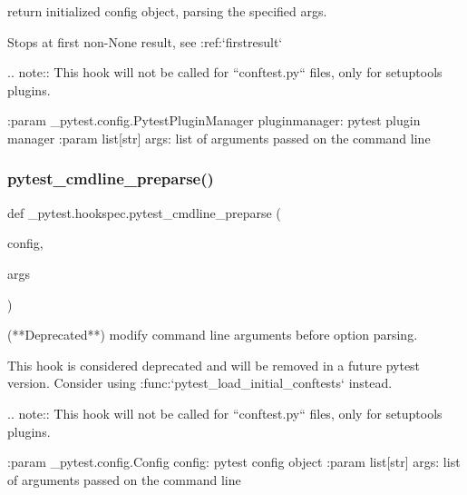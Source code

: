 \begin{DoxyVerb}return initialized config object, parsing the specified args.

Stops at first non-None result, see :ref:`firstresult`

.. note::
    This hook will not be called for ``conftest.py`` files, only for setuptools plugins.

:param _pytest.config.PytestPluginManager pluginmanager: pytest plugin manager
:param list[str] args: list of arguments passed on the command line
\end{DoxyVerb}
 \mbox{\label{namespace__pytest_1_1hookspec_afbabf1ad58d128c7078a1de3228fe31b}} 
\subsubsection{\texorpdfstring{pytest\+\_\+cmdline\+\_\+preparse()}{pytest\_cmdline\_preparse()}}
{\footnotesize\ttfamily def \+\_\+pytest.\+hookspec.\+pytest\+\_\+cmdline\+\_\+preparse (\begin{DoxyParamCaption}\item[{}]{config,  }\item[{}]{args }\end{DoxyParamCaption})}

\begin{DoxyVerb}(**Deprecated**) modify command line arguments before option parsing.

This hook is considered deprecated and will be removed in a future pytest version. Consider
using :func:`pytest_load_initial_conftests` instead.

.. note::
    This hook will not be called for ``conftest.py`` files, only for setuptools plugins.

:param _pytest.config.Config config: pytest config object
:param list[str] args: list of arguments passed on the command line
\end{DoxyVerb}
 \mbox{\label{namespace__pytest_1_1hookspec_a1f9b6e29568c9ad5d395a2bda355d380}} 
